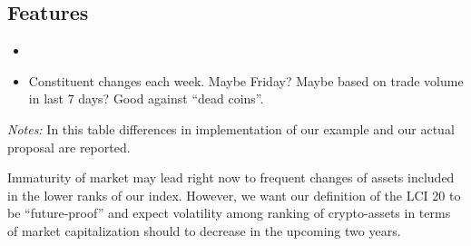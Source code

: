 \documentclass[11pt]{article}
\newcommand\fnotes[1]{\captionsetup{font=scriptsize}\caption*{\textsl{Notes:} #1}}
\begin{document}
\subsection{Features}

\begin{itemize}
  \item
  \item Constituent changes each week. Maybe Friday? Maybe based on trade volume in last 7 days? Good against ``dead coins''.
\end{itemize}

\begin{table}
\caption{Table explaining differences: proposal vs.\ example}
\centering
{}
\fnotes{In this table differences in implementation of our example and our actual proposal are reported.}
\end{table}





Immaturity of market may lead right now to frequent changes of assets included in the lower ranks of our index.
However, we want our definition of the LCI 20 to be ``future-proof'' and expect volatility among ranking of crypto-assets in terms of market capitalization should to decrease in the upcoming two years.












\end{document}
